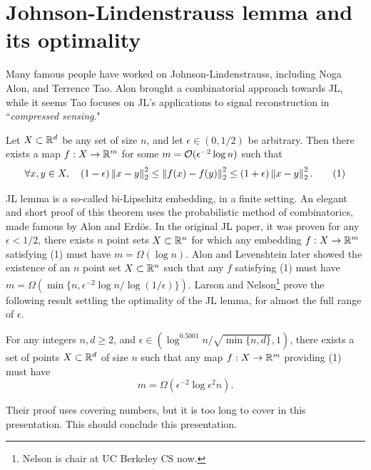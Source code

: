 \documentclass[11pt]{article}
\begin{document}
  \section{Johnson-Lindenstrauss lemma and its optimality}
  Many famous people have worked on Johnson-Lindenstrauss, including Noga Alon, and Terrence Tao.
  Alon brought a combinatorial approach towards JL, while it seems Tao focuses on JL's applications to 
  signal reconstruction in ``\emph{compressed sensing}."
  \begin{theorem}
    Let $X \subset \mathbb{R}^d$ be any set of size $n$, and let $\epsilon \in (0,1/2)$ be arbitrary.
    Then there exists a map $f : X \to \mathbb{R}^m$ for some $m = \mathcal{O}(\epsilon^{-2}\log{n})$ such that
    \begin{equation*}
      \forall x,y\in X, \quad (1-\epsilon)\left\lVert x-y\right\rVert_2^2 \le \left\lVert f(x)-f(y)\right\rVert_2^2 \le (1+\epsilon)\left\lVert x-y\right\rVert_2^2.\tag{1}
    \end{equation*}
  \end{theorem}
  JL lemma is a so-called bi-Lipschitz embedding, in a finite setting. An elegant and short proof of
  this theorem uses the probabilistic
  method of combinatorics, made famous by Alon and Erd\"os.
  In the original JL paper, it was proven for any $\epsilon < 1/2$, there exists $n$ point sets
  $X\subset \mathbb{R}^n$ for which any embedding $f : X \to \mathbb{R}^m$ satisfying (1) must have
  $m = \Omega(\log{n})$. Alon and Levenshtein later showed the existence of an $n$ point
  set $X \subset \mathbb{R}^n$ such that any $f$ satisfying (1) must have 
  $m = \Omega(\min\{n, \epsilon^{-2}\log{n}/\log{(1/\epsilon)}\}).$
  Larson and Nelson\footnote{Nelson is chair at UC Berkeley CS now.} prove the following result settling the optimality
  of the JL lemma, for almost the full range of $\epsilon$.
  \begin{theorem}
    For any integers $n,d \ge 2$, and $\epsilon \in (\log^{0.5001}{n/ \sqrt{\min\{n,d\}}}, 1)$, there exists
    a set of points $X \subset \mathbb{R}^d$ of size $n$ such that any map $f : X \to \mathbb{R}^m$ providing (1)
    must have $$
    m = \Omega(\epsilon^{-2}\log{\epsilon^2n}).
    $$
  \end{theorem}
  Their proof uses covering numbers, but it is too long to cover in this presentation.
  This should conclude this presentation.
  \nocite{*}
  
  
\end{document}
